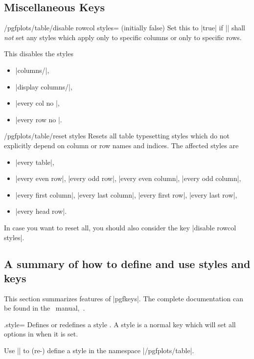 \subsection{Miscellaneous Keys}
\begin{key}{/pgfplots/table/disable rowcol styles= (initially false)}
	Set this to |true| if |\pgfplotstabletypeset| shall \emph{not} set any styles which apply only to specific columns or only to specific rows.

	This disables the styles
	\begin{itemize}
		\item |columns/|,
		\item |display columns/|,
		\item |every col no |,
		\item |every row no |.
	\end{itemize}
\end{key}

\begin{key}{/pgfplots/table/reset styles}
	Resets all table typesetting styles which do not explicitly depend on column or row names and indices. The affected styles are
	\begin{itemize}
		\item |every table|,
		\item |every even row|, |every odd row|, |every even column|, |every odd column|,
		\item |every first column|, |every last column|, |every first row|, |every last row|,
		\item |every head row|.
	\end{itemize}
	In case you want to reset all, you should also consider the key |disable rowcol styles|.
\end{key}

\subsection{A summary of how to define and use styles and keys}
This section summarizes features of |pgfkeys|. The complete documentation can be found in the \pgfname\ manual,~\cite{tikz}.
\begin{handler}{{.style}=}
	Defines or redefines a style . A style is a normal key which will set all options in  when it is set.

	Use	|| to (re-) define a style  in the namespace |/pgfplots/table|.
\end{handler}

